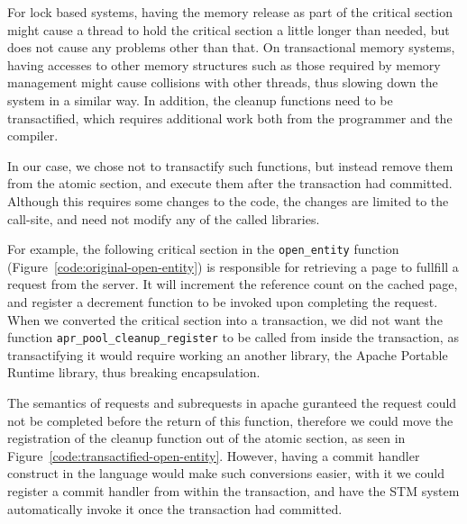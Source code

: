 \documentclass[preprint,11pt]{sigplanconf}
\begin{document}
For lock based systems, having the memory release as part of the critical
section might cause a thread to hold the critical section a little longer than
needed, but does not cause any problems other than that. On transactional memory
systems, having accesses to other memory structures such as those required by
memory management might cause collisions with other threads, thus slowing down
the system in a similar way. In addition, the cleanup functions need to be
transactified, which requires additional work both from the programmer and the
compiler.

In our case, we chose not to transactify such functions, but instead remove them
from the atomic section, and execute them after the transaction had committed.
Although this requires some changes to the code, the changes are limited to the
call-site, and need not modify any of the called libraries.

For example, the following critical section in the {\tt open\_entity} function
(Figure~\ref{code:original-open-entity}) is responsible for retrieving a page
to fullfill a request from the server. It will increment the reference count on
the cached page, and register a decrement function to be invoked upon completing
the request. When we converted the critical section into a transaction, we
did not want the function {\tt apr\_pool\_cleanup\_register} to be called from
inside the transaction, as transactifying it would require working an another
library, the Apache Portable Runtime library, thus breaking encapsulation.

The semantics of requests and subrequests in apache guranteed the request
could not be completed before the return of this function, therefore we could
move the registration of the cleanup function out of the atomic section, as seen
in Figure~\ref{code:transactified-open-entity}. However, having a commit
handler construct in the language would make such conversions easier, with it we
could register a commit handler from within the transaction, and have the STM
system automatically invoke it once the transaction had committed.
\end{document}
